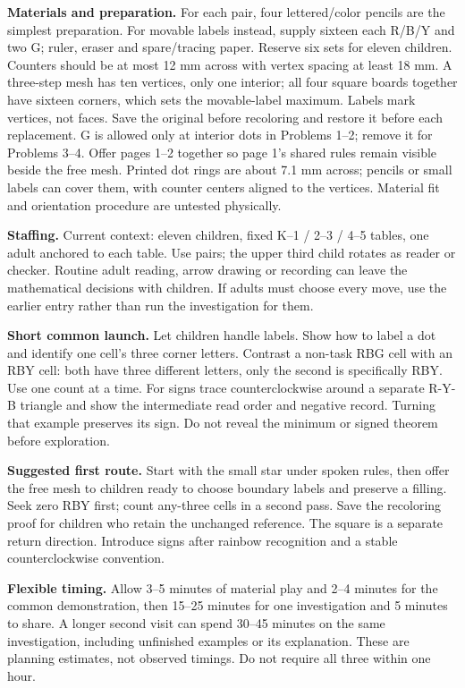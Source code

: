 \documentclass[11pt]{article}
\begin{document}
\textbf{Materials and preparation.} For each pair, four lettered/color pencils are the simplest preparation. For movable labels instead, supply sixteen each R/B/Y and two G; ruler, eraser and spare/tracing paper. Reserve six sets for eleven children. Counters should be at most 12 mm across with vertex spacing at least 18 mm. A three-step mesh has ten vertices, only one interior; all four square boards together have sixteen corners, which sets the movable-label maximum. Labels mark vertices, not faces. Save the original before recoloring and restore it before each replacement. G is allowed only at interior dots in Problems 1–2; remove it for Problems 3–4. Offer pages 1–2 together so page 1’s shared rules remain visible beside the free mesh. Printed dot rings are about 7.1 mm across; pencils or small labels can cover them, with counter centers aligned to the vertices. Material fit and orientation procedure are untested physically.

\textbf{Staffing.} Current context: eleven children, fixed K--1 / 2--3 / 4--5 tables, one adult anchored to each table. Use pairs; the upper third child rotates as reader or checker. Routine adult reading, arrow drawing or recording can leave the mathematical decisions with children. If adults must choose every move, use the earlier entry rather than run the investigation for them.

\textbf{Short common launch.} Let children handle labels. Show how to label a dot and identify one cell’s three corner letters. Contrast a non-task RBG cell with an RBY cell: both have three different letters, only the second is specifically RBY. Use one count at a time. For signs trace counterclockwise around a separate R-Y-B triangle and show the intermediate read order and negative record. Turning that example preserves its sign. Do not reveal the minimum or signed theorem before exploration.

\textbf{Suggested first route.} Start with the small star under spoken rules, then offer the free mesh to children ready to choose boundary labels and preserve a filling. Seek zero RBY first; count any-three cells in a second pass. Save the recoloring proof for children who retain the unchanged reference. The square is a separate return direction. Introduce signs after rainbow recognition and a stable counterclockwise convention.

\textbf{Flexible timing.} Allow 3--5 minutes of material play and 2--4 minutes for the common demonstration, then 15--25 minutes for one investigation and 5 minutes to share. A longer second visit can spend 30--45 minutes on the same investigation, including unfinished examples or its explanation. These are planning estimates, not observed timings. Do not require all three within one hour.
\end{document}
